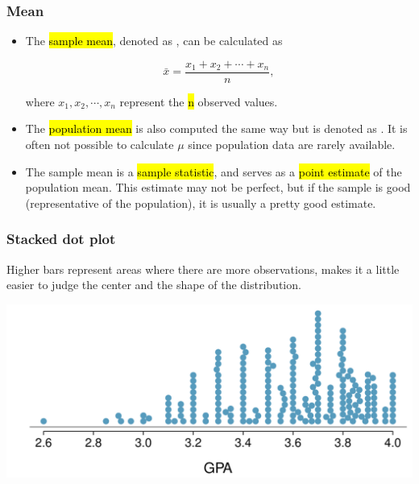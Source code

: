 
\begin{frame}
\frametitle{Mean}

\begin{itemize}

\item The \hl{sample mean}, denoted as , can be calculated as

\[ \bar{x} = \frac{x_1 + x_2 + \cdots + x_n}{n}, \]

where $x_1, x_2, \cdots, x_n$ represent the \hl{n} observed values.

\item The \hl{population mean} is also computed the same way but is denoted as \mathhl{\mu}. It is often not possible to calculate $\mu$ since population data are rarely available.

\item The sample mean is a \hl{sample statistic}, and serves as a \hl{point estimate} of the population mean. This estimate may not be perfect, but if the sample is good (representative of the population), it is usually a pretty good estimate. 

\end{itemize}

\end{frame}


\begin{frame}
\frametitle{Stacked dot plot}

Higher bars represent areas where there are more observations, makes it a little easier to judge the center and the shape of the distribution.

\begin{center}
\includegraphics[width=\textwidth]{2-1_numerical_data/figures/gpa_dot_plot/gpa_dot_plot_stacked}
\end{center}

\end{frame}

